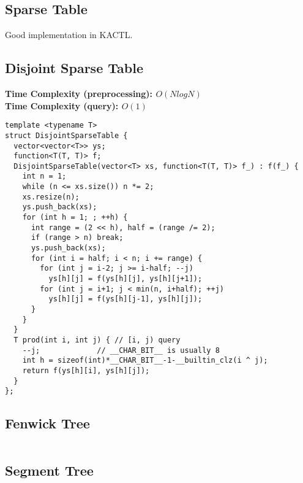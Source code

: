 \subsection{Sparse Table}

Good implementation in KACTL.

\subsection{Disjoint Sparse Table}

\textbf{Time Complexity (preprocessing): $O(N log N)$}\\
\textbf{Time Complexity (query): $O(1)$}\\

\begin{lstlisting}
template <typename T>
struct DisjointSparseTable {
  vector<vector<T>> ys;
  function<T(T, T)> f;
  DisjointSparseTable(vector<T> xs, function<T(T, T)> f_) : f(f_) {
    int n = 1;
    while (n <= xs.size()) n *= 2;
    xs.resize(n);
    ys.push_back(xs);
    for (int h = 1; ; ++h) {
      int range = (2 << h), half = (range /= 2);
      if (range > n) break;
      ys.push_back(xs);
      for (int i = half; i < n; i += range) {
        for (int j = i-2; j >= i-half; --j) 
          ys[h][j] = f(ys[h][j], ys[h][j+1]);
        for (int j = i+1; j < min(n, i+half); ++j) 
          ys[h][j] = f(ys[h][j-1], ys[h][j]);
      }
    }
  }
  T prod(int i, int j) { // [i, j) query
    --j;             // __CHAR_BIT__ is usually 8
    int h = sizeof(int)*__CHAR_BIT__-1-__builtin_clz(i ^ j);
    return f(ys[h][i], ys[h][j]);
  }
};
\end{lstlisting}

\subsection{Fenwick Tree}

\hrulefill \vspace{-\baselineskip}
\begin{multicols}{2}
\inputminted[autogobble,fontsize=\footnotesize]{C++}{Data Structures/fenwick_tree.cpp}
\end{multicols}
\vspace{-\baselineskip}
\noindent \hrulefill

\newpage

\subsection{Segment Tree}

